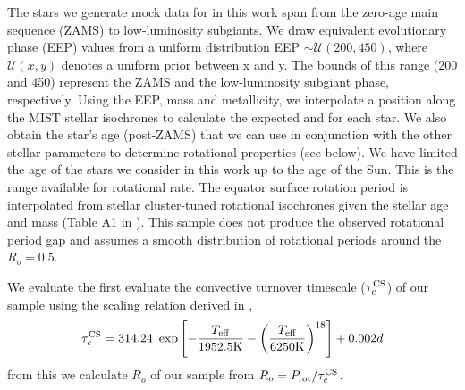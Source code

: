 The stars we generate mock data for in this work span from the zero-age main sequence (ZAMS) to low-luminosity subgiants. We draw equivalent evolutionary phase (EEP) values from a uniform distribution EEP $\sim \mathcal{U}(200,450)$, where $\mathcal{U}\left(x,y\right)$ denotes a uniform prior between x and y.
The bounds of this range (200 and 450) represent the ZAMS and the low-luminosity subgiant phase, respectively. 
Using the EEP, mass and metallicity, we interpolate a position along the MIST stellar isochrones \citep{morton_isochrones_2015} to calculate the expected \teff and \logg for each star.
We also obtain the star's age (post-ZAMS) that we can use in conjunction with the other stellar parameters to determine rotational properties (see below). We have limited the age of the stars we consider in this work up to the age of the Sun. 
This is the range available for rotational rate.
The equator surface rotation period is interpolated from stellar cluster-tuned rotational isochrones given the stellar age and mass (Table A1 in \citet{spada_angular_2016}).
This sample does not produce the observed rotational period gap and assumes a smooth distribution of rotational periods around the $R_o =0.5$.

We evaluate the first evaluate the convective turnover timescale ($\tau_c^{\rm{CS}}$) of our sample using the scaling relation derived in \citet{cranmer_testing_2011},
\begin{equation}
	\tau_c^{\rm{CS}} = 314.24 \ \exp\left[ -\frac{T_{\rm{eff}}}{1952.5\rm{K}} - \left( \frac{T_{\rm{eff}}}{6250 \rm{K}}\right)^{18}\right] + 0.002 d
\end{equation}
from this we calculate $R_o$ of our sample from $R_o = P_{\rm{rot}}/\tau_c^{\rm{CS}}$.

